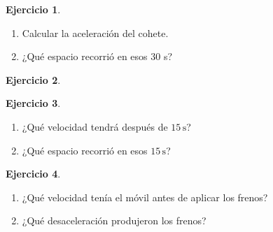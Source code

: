 \documentclass[a4paper,12pt,twoside]{book}
\newtheorem{ejercicio}{{Ejercicio}}[chapter]
\begin{document}
\begin{mdframed}[style=ejercicio-facil]
    \begin{ejercicio}
    \end{ejercicio}
    \begin{enumerate}
        \item Calcular la aceleración del cohete.
        \item ¿Qué espacio recorrió en esos 30 s?
    \end{enumerate}
\end{mdframed}

\begin{mdframed}[style=ejercicio-facil]
    \begin{ejercicio}
    \end{ejercicio}
\end{mdframed}

\begin{mdframed}[style=ejercicio-facil]
    \begin{ejercicio}
    \end{ejercicio}
    \begin{enumerate}
        \item ¿Qué velocidad tendrá después de $15\,\si{\second}$?
        \item ¿Qué espacio recorrió en esos $15\,\si{\second}$?
    \end{enumerate}
\end{mdframed}

\begin{mdframed}[style=ejercicio-facil]
    \begin{ejercicio}
    \end{ejercicio}
    \begin{enumerate}
        \item ¿Qué velocidad tenía el móvil antes de aplicar los frenos?
        \item ¿Qué desaceleración produjeron los frenos?
    \end{enumerate}
\end{mdframed}
\end{document}
